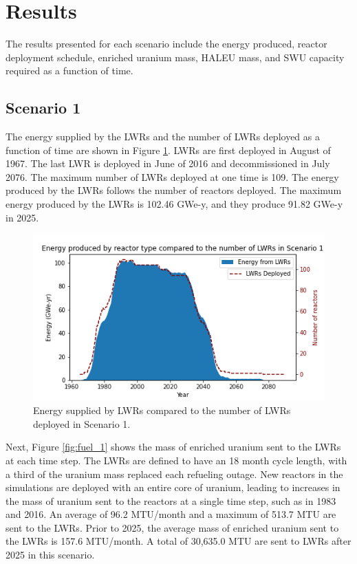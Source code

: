 \section{Results}
The results presented for each scenario include the energy produced, reactor 
deployment schedule, enriched
uranium mass, \gls{HALEU} mass, and \gls{SWU} capacity required as a function 
of time. 

\subsection{Scenario 1}
The energy supplied by the \glspl{LWR} and the number of \glspl{LWR}
deployed as a function of time are shown in Figure \ref{fig:energy_rx_1}. 
\glspl{LWR} are first deployed in August of 1967. The last 
\gls{LWR} is deployed in June of 2016 and decommissioned in July 2076. The 
maximum number of 
\glspl{LWR} deployed at one time is 109. The energy produced by the 
\glspl{LWR} follows the number of reactors deployed. The maximum energy 
produced by the \glspl{LWR} is 102.46 GWe-y, and they produce 91.82 GWe-y 
in 2025.

\begin{figure}
    \centering 
    \includegraphics[width=\textwidth]{../figures/energy_scenario1.png}
    \caption{Energy supplied by \glspl{LWR} compared to the number of 
    \glspl{LWR} deployed in Scenario 1.}
    \label{fig:energy_rx_1}
\end{figure}

Next, Figure \ref{fig:fuel_1} shows the mass of enriched uranium sent to 
the \glspl{LWR} at each time step. The \glspl{LWR} are 
defined to have an 18 month cycle length, with a third of the uranium 
mass replaced each refueling outage. New reactors in the simulations 
are deployed with an entire core of uranium, leading 
to increases in the mass of uranium sent to the reactors at a single time 
step, such 
as in 1983 and 2016. An average of 96.2 MTU/month and a maximum of 513.7 MTU 
are sent to the \glspl{LWR}. Prior to 2025, the average mass
of enriched uranium sent to the \glspl{LWR} is 157.6 MTU/month. A total 
of 30,635.0 MTU are sent to \glspl{LWR} after 2025 in this scenario. 

